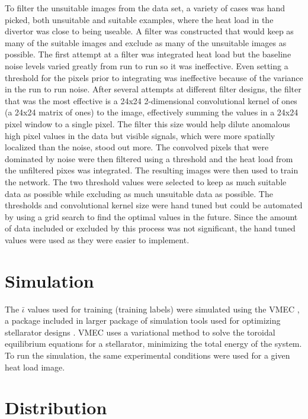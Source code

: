 To filter the unsuitable images from the data set, a variety of cases was hand picked, both unsuitable and suitable examples, where the heat load in the divertor was close to being useable. A filter was constructed that would keep as many of the suitable images and exclude as many of the unsuitable images as possible. The first attempt at a filter was integrated heat load but the baseline noise levels varied greatly from run to run so it was ineffective. Even setting a threshold for the pixels prior to integrating was ineffective because of the variance in the run to run noise. After several attempts at different filter designs, the filter that was the most effective is a 24x24 2-dimensional convolutional kernel of ones (a 24x24 matrix of ones) to the image, effectively summing the values in a 24x24 pixel window to a single pixel. The filter this size would help dilute anomalous high pixel values in the data but visible signals, which were more spatially localized than the noise, stood out more. The convolved pixels that were dominated by noise were then filtered using a threshold and the heat load from the unfiltered pixes was integrated. The resulting images were then used to train the network. The two threshold values were selected to keep as much suitable data as possible while excluding as much unsuitable data as possible. The thresholds and convolutional kernel size were hand tuned but could be automated by using a grid search to find the optimal values in the future. Since the amount of data included or excluded by this process was not significant, the hand tuned values were used as they were easier to implement.




\label{sec:Data Simulation}
\section{Simulation}

The $\bar{\iota}$ values used for training (training labels) were simulated using the VMEC \cite{VMEC}, a package included in larger package of simulation tools used for optimizing stellarator designs \cite{STELLOPT}. VMEC uses a variational method to solve the toroidal equilibrium equations for a stellarator, minimizing the total energy of the system\cite{VMEC}. To run the simulation, the same experimental conditions were used for a given heat load image.

\label{sec:Data Distribution}
\section{Distribution}

